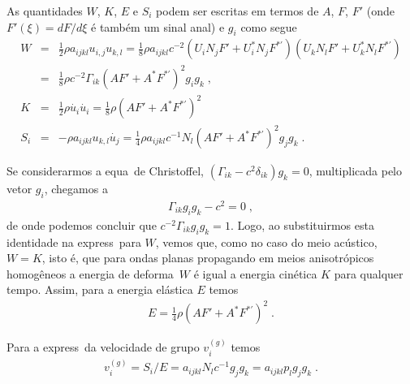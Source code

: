 As quantidades $W$, $K$, $E$ e $S_i$ podem ser
escritas em termos de $A$, $F$, $F'$ (onde
$F'(\xi)=dF/d\xi$ \'e tamb\'em um sinal anal\itico)
e $g_i$ como segue
\begin{eqnarray}
W &=& \frac{1}{2}\rho a_{ijkl} u_{i,j} u_{k,l}
= \frac{1}{8}\rho a_{ijkl} c^{-2} (U_i N_j F' + 
U_i^{*} N_j F^{*'})(U_k N_l F'+U_k^{*} N_l F^{*'})
\nonumber\\
&=& \frac{1}{8}\rho c^{-2} \Gamma_{ik}(AF' +
A^{*}F^{*'})^2 g_i g_k \; , \\
K &=& \frac{1}{2}\rho\dot{u_i}\dot{u_i} =
\frac{1}{8}\rho(AF' + A^{*}F^{*'})^2 \\
S_i &=& -\rho a_{ijkl} u_{k,l}\dot{u_j} = \frac{1}{4}
\rho a_{ijkl} c^{-1} N_l (AF'+ A^{*}F^{*'})^2
g_j g_k \; .
\end{eqnarray}

Se considerarmos a equa\cao\ de Christoffel,
$(\Gamma_{ik} - c^2 \delta_{ik}) g_k = 0$,
multiplicada pelo vetor $g_i$, chegamos a
\begin{eqnarray}
\Gamma_{ik} g_i g_k - c^2 = 0 \; ,
\end{eqnarray}
de onde podemos concluir que $c^{-2}\Gamma_{ik} g_i
g_k = 1$. Logo, ao substituirmos esta identidade
na express\ao\ para $W$, vemos que, como no caso
do meio ac\'ustico, $W = K$, isto \'e, que para ondas
planas propagando em meios anisotr\'opicos
homog\^eneos a energia de deforma\cao\ $W$ \'e igual
a energia cin\'etica $K$ para qualquer tempo. Assim,
para a energia el\'astica $E$ temos
\begin{eqnarray}
E = \frac{1}{4} \rho (AF'+ A^{*}F^{*'})^2 \; .
\end{eqnarray}

Para a express\ao\ da velocidade de grupo $v_i^{(g)}$
temos
\begin{eqnarray} \label{vgmah}
v_i^{(g)} = S_i/E = a_{ijkl} N_l c^{-1} g_j g_k =
a_{ijkl} p_l g_j g_k \; .
\end{eqnarray}

